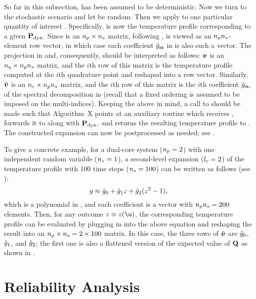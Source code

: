 So far in this subsection, \vu has been assumed to be deterministic. Now we turn
to the stochastic scenario and let \vu be random. Then we apply
 to one particular quantity of interest \g.
Specifically, \g is now the temperature profile \mq corresponding to a given
$\mathbf{P}_{\mathrm{dyn}}$. Since \mq is an ${n_{p}} \times {n_{s}}$ matrix, following
, \g is viewed as an ${n_{p}} {n_{s}}$-element row vector, in
which case each coefficient $\hat{g}_{\boldsymbol{\alpha}}$ in
 is also such a vector. The projection in
 and, consequently, 
should be interpreted as follows: $\boldsymbol{v}$ is an ${n_{q}} \times {n_{p}} {n_{s}}$ matrix, and
the $i$th row of this matrix is the temperature profile computed at the $i$th
quadrature point and reshaped into a row vector. Similarly, $\hat{\boldsymbol{v}}$ is an
${n_{c}} \times {n_{p}} {n_{s}}$ matrix, and the $i$th row of this matrix is the $i$th
coefficient $\hat{g}_{\boldsymbol{\alpha}_i}$ of the spectral decomposition in
 (recall that a fixed ordering is assumed to be
imposed on the multi-indices). Keeping the above in mind, a call to
 should be made such that Algorithm~X points at an
auxiliary routine which receives \vu, forwards it to 
along with $\mathbf{P}_{\mathrm{dyn}}$, and returns the resulting temperature profile to
. The constructed expansion can now be
postprocessed as needed; see .

To give a concrete example, for a dual-core system (${n_{p}} = 2$) with one
independent random variable (${n_{z}} = 1$), a second-level expansion (${l_{c}} = 2$) of
the temperature profile with 100 time steps (${n_{s}} = 100$) can be written as
follows (see ):
\[
  g \approx \hat{g}_0 + \hat{g}_1 z + \hat{g}_2(z^2 - 1),
\]
which is a polynomial in \z, and each coefficient is a vector with ${n_{p}} {n_{s}} =
200$ elements. Then, for any outcome $\z \equiv \z(\o)$, the corresponding
temperature profile \mq can be evaluated by plugging in \z into the above
equation and reshaping the result into an ${n_{p}} \times {n_{s}} = 2 \times 100$
matrix. In this case, the three rows of $\hat{\boldsymbol{v}}$ are $\hat{g}_0$,
$\hat{g}_1$, and $\hat{g}_2$; the first one is also a flattened version of the
expected value of $\mathbf{Q}$ as shown in .

\section{Reliability Analysis}

